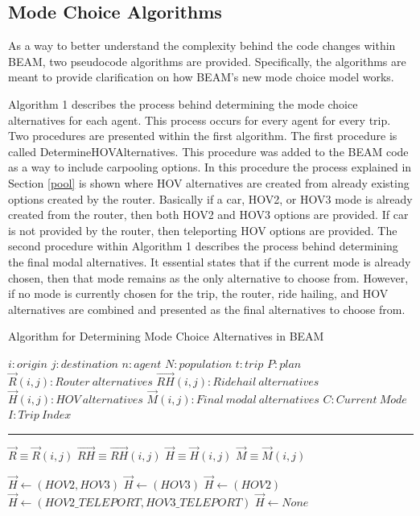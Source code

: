 \documentclass[12pt, oneside, openright]{byuthesis}
\begin{document}
\hypertarget{algo}{%
\subsection{Mode Choice Algorithms}\label{algo}}

As a way to better understand the complexity behind the code changes within BEAM, two pseudocode algorithms are provided. Specifically, the algorithms are meant to provide clarification on how BEAM's new mode choice model works.

Algorithm 1 describes the process behind determining the mode choice alternatives for each agent. This process occurs for every agent for every trip. Two procedures are presented within the first algorithm. The first procedure is called DetermineHOVAlternatives. This procedure was added to the BEAM code as a way to include carpooling options. In this procedure the process explained in Section \ref{pool} is shown where HOV alternatives are created from already existing options created by the router. Basically if a car, HOV2, or HOV3 mode is already created from the router, then both HOV2 and HOV3 options are provided. If car is not provided by the router, then teleporting HOV options are provided. The second procedure within Algorithm 1 describes the process behind determining the final modal alternatives. It essential states that if the current mode is already chosen, then that mode remains as the only alternative to choose from. However, if no mode is currently chosen for the trip, the router, ride hailing, and HOV alternatives are combined and presented as the final alternatives to choose from.

\begin{algorithm} [tph]
\caption{Algorithm for Determining Mode Choice Alternatives in BEAM}
\begin{algorithmic}[1]
\Require
\State $i : origin$
\State $j : destination$
\State $n: agent$
\State $N: population$
\State $t : trip $
\State $P : plan$
\State $\vec{R}(i,j) : Router\: alternatives$
\State $\vec{RH}(i,j) : Ridehail\:alternatives$
\State $\vec{H}(i,j) : HOV\:alternatives$
\State $\vec{M}(i,j) : Final\:modal\:alternatives$
\State $C : Current\:Mode$
\State $I : Trip\:Index$
\vspace{4pt}\hrule\vspace{5pt}

\State $\vec{R} \equiv \vec{R}(i,j)$
\State $\vec{RH} \equiv \vec{RH}(i,j)$
\State $\vec{H} \equiv \vec{H}(i,j)$
\State $\vec{M} \equiv \vec{M}(i,j)$

    \State $\vec{H} \gets (HOV2,HOV3)$
    \State $\vec{H} \gets (HOV3)$
    \State $\vec{H} \gets (HOV2)$
    \State $\vec{H} \gets (HOV2\_TELEPORT, HOV3\_TELEPORT)$
  \EndIf
\Else
  \State $\vec{H} \gets None$
\EndIf
\EndProcedure
\Statex
{}
\end{algorithmic}
\end{algorithm}
\end{document}
